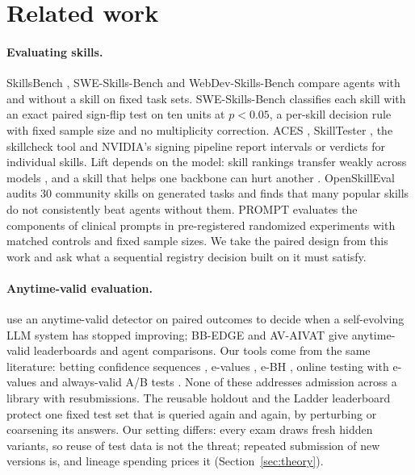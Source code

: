 \section{Related work}
\label{sec:related}

\paragraph{Evaluating skills.} SkillsBench \citep{li2026skillsbench}, SWE-Skills-Bench \citep{han2026sweskillsbench} and WebDev-Skills-Bench \citep{yang2026webdevskills} compare agents with and without a skill on fixed task sets. SWE-Skills-Bench classifies each skill with an exact paired sign-flip test on ten units at $p<0.05$, a per-skill decision rule with fixed sample size and no multiplicity correction. ACES \citep{kevin2026aces}, SkillTester \citep{wang2026skilltester}, the skillcheck tool \citep{sx4im2026skillcheck} and NVIDIA's signing pipeline \citep{nvidia2026trustpipeline} report intervals or verdicts for individual skills. Lift depends on the model: skill rankings transfer weakly across models \citep{yang2026webdevskills}, and a skill that helps one backbone can hurt another \citep{yu2026masa}. OpenSkillEval \citep{ying2026openskilleval} audits 30 community skills on generated tasks and finds that many popular skills do not consistently beat agents without them. PROMPT \citep{hu2026prompt} evaluates the components of clinical prompts in pre-registered randomized experiments with matched controls and fixed sample sizes. We take the paired design from this work and ask what a sequential registry decision built on it must satisfy.

\paragraph{Anytime-valid evaluation.} \citet{yin2026enough} use an anytime-valid detector on paired outcomes to decide when a self-evolving LLM system has stopped improving; BB-EDGE \citep{gao2026bbedge} and AV-AIVAT \citep{li2026avaivat} give anytime-valid leaderboards and agent comparisons. Our tools come from the same literature: betting confidence sequences \citep{waudbysmith2024betting}, e-values \citep{ramdas2023gametheoretic,grunwald2024safe}, e-BH \citep{wang2022ebh}, online testing with e-values \citep{xu2024online} and always-valid A/B tests \citep{johari2022always}. None of these addresses admission across a library with resubmissions. The reusable holdout and the Ladder leaderboard \citep{dwork2015reusable,blum2015ladder} protect one fixed test set that is queried again and again, by perturbing or coarsening its answers. Our setting differs: every exam draws fresh hidden variants, so reuse of test data is not the threat; repeated submission of new versions is, and lineage spending prices it (Section~\ref{sec:theory}).

